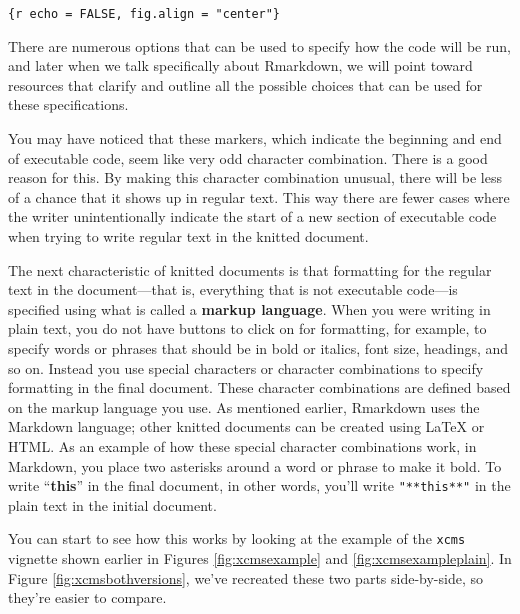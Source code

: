 \documentclass[]{tufte-book}
\begin{document}
\texttt{\textasciigrave{}\textasciigrave{}\textasciigrave{}\{r\ echo\ =\ FALSE,\ fig.align\ =\ "center"\}}

There are numerous options that can be used to specify how the code will be run,
and later when we talk specifically about Rmarkdown, we will point toward
resources that clarify and outline all the possible choices that can be used for
these specifications.

You may have noticed that these markers, which indicate the beginning and end of
executable code, seem like very odd character combination. There is a good
reason for this. By making this character combination unusual, there will be
less of a chance that it shows up in regular text. This way there are fewer
cases where the writer unintentionally indicate the start of a new section of
executable code when trying to write regular text in the knitted document.

The next characteristic of knitted documents is that formatting for the regular
text in the document---that is, everything that is not executable code---is
specified using what is called a \textbf{markup language}. When you were writing in
plain text, you do not have buttons to click on for formatting, for example, to
specify words or phrases that should be in bold or italics, font size, headings,
and so on. Instead you use special characters or character combinations to
specify formatting in the final document. These character combinations are
defined based on the markup language you use. As mentioned earlier, Rmarkdown
uses the Markdown language; other knitted documents can be created using LaTeX
or HTML. As an example of how these special character combinations work, in
Markdown, you place two asterisks around a word or phrase to make it bold. To
write ``\textbf{this}'' in the final document, in other words, you'll write
\texttt{"**this**"} in the plain text in the initial document.

You can start to see how this works by looking at the example of the \texttt{xcms}
vignette shown earlier in Figures \ref{fig:xcmsexample} and
\ref{fig:xcmsexampleplain}. In Figure \ref{fig:xcmsbothversions}, we've
recreated these two parts side-by-side, so they're easier to compare.
\end{document}
